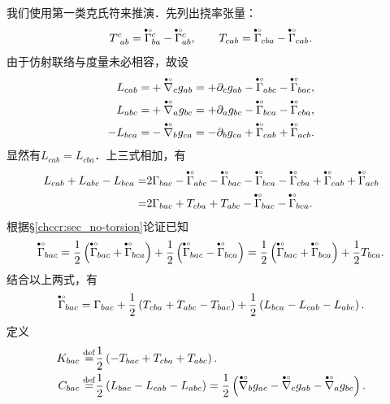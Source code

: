 我们使用第一类克氏符来推演．先列出挠率张量：
\begin{equation*}
	T^c_{\hphantom{c}ab} = \oversetmy{\bullet\circ}{\Gamma}^c_{ba}-\oversetmy{\bullet\circ}{\Gamma}^c_{ab},\qquad
	T_{cab} = \oversetmy{\bullet\circ}{\Gamma}_{cba}- \oversetmy{\bullet\circ}{\Gamma}_{cab}.
\end{equation*}
由于仿射联络与度量未必相容，故设
\begin{align*}
	L_{cab}=&+\oversetmy{\bullet\circ}{\nabla}_c g_{ab} =
	+\partial_c g_{ab} - \oversetmy{\bullet\circ}{\Gamma}_{abc} -\oversetmy{\bullet\circ}{\Gamma}_{bac}, \\
	L_{abc}=&+\oversetmy{\bullet\circ}{\nabla}_a g_{bc} =
	+\partial_a g_{bc} - \oversetmy{\bullet\circ}{\Gamma}_{bca} -\oversetmy{\bullet\circ}{\Gamma}_{cba}, \\
	-L_{bca}=&-\oversetmy{\bullet\circ}{\nabla}_b g_{ca} =
	-\partial_b g_{ca} + \oversetmy{\bullet\circ}{\Gamma}_{cab} +\oversetmy{\bullet\circ}{\Gamma}_{acb}.
\end{align*}
显然有$L_{cab}=L_{cba}$．上三式相加，有
\begin{align*}
	L_{cab}+L_{abc}-L_{bca}=&2\Gamma_{bac}- \oversetmy{\bullet\circ}{\Gamma}_{abc} -\oversetmy{\bullet\circ}{\Gamma}_{bac}- \oversetmy{\bullet\circ}{\Gamma}_{bca} -\oversetmy{\bullet\circ}{\Gamma}_{cba}+ \oversetmy{\bullet\circ}{\Gamma}_{cab} +\oversetmy{\bullet\circ}{\Gamma}_{acb} \\
	=&2\Gamma_{bac} + T_{cba} +T_{abc}  -\oversetmy{\bullet\circ}{\Gamma}_{bac}- \oversetmy{\bullet\circ}{\Gamma}_{bca} .
\end{align*}
根据\S\ref{chccr:sec_no-torsion}论证已知
\begin{align*}
	\oversetmy{\bullet\circ}{\Gamma}_{bac} = \frac{1}{2} \left(\oversetmy{\bullet\circ}{\Gamma}_{bac}
	+\oversetmy{\bullet\circ}{\Gamma}_{bca} \right) 
	+\frac{1}{2} \left(\oversetmy{\bullet\circ}{\Gamma}_{bac}-\oversetmy{\bullet\circ}{\Gamma}_{bca} \right)
	= \frac{1}{2} \left(\oversetmy{\bullet\circ}{\Gamma}_{bac}
	+\oversetmy{\bullet\circ}{\Gamma}_{bca} \right) +\frac{1}{2}T_{bca} .
\end{align*}
结合以上两式，有
\begin{align*}
	\oversetmy{\bullet\circ}{\Gamma}_{bac} 
	=\Gamma_{bac}	+ \frac{1}{2} \left( T_{cba} +T_{abc}-T_{bac}\right)  
	+ \frac{1}{2}\left(L_{bca}-L_{cab}-L_{abc}\right) .
\end{align*}
定义
\begin{align}
	K_{bac} \overset{\mathrm {def}}{=}& \frac{1}{2}\left(-T_{bac}+ T_{cba} +T_{abc}\right) . \\
	C_{bac} \overset{\mathrm {def}}{=}& \frac{1}{2}\left(L_{bac}-L_{cab}-L_{abc}\right)
	=\frac{1}{2}\left( \oversetmy{\bullet\circ}{\nabla}_b g_{ac} 
	-\oversetmy{\bullet\circ}{\nabla}_c g_{ab}
	-\oversetmy{\bullet\circ}{\nabla}_a g_{bc} \right) .
\end{align}
